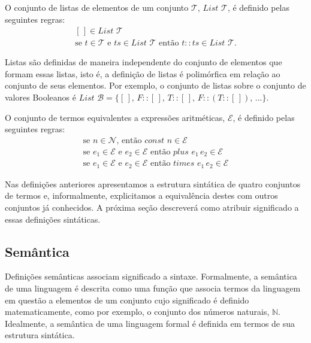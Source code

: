 \begin{Definition}
  O conjunto de listas de elementos de um conjunto $\mathcal{T}$, $\textit{List }\mathcal{T}$, \'e definido pelas seguintes regras:
  \[
  \begin{array}{l}
    [\,] \in \textit{List }\mathcal{T}\\
    \text{se }t \in \mathcal{T} \text{ e } ts \in \textit{List }\mathcal{T}\text{ ent\~ao } t :: ts \in \textit{List }\mathcal{T}.
  \end{array}
  \]
\end{Definition}
Listas s\~ao definidas de maneira independente do conjunto de elementos que formam essas listas, isto \'e, a defini\c{c}\~ao de listas
\'e polim\'orfica em rela\c{c}\~ao ao conjunto de seus elementos.
Por exemplo, o conjunto de listas sobre 
o conjunto de valores Booleanos \'e $\textit{List }\mathcal{B}=\{[\,],\,F :: [\,],\,T :: [\,],\, F :: (T :: [\,]),\, ...\}$.

\begin{Definition}\label{def:arithexp}
  O conjunto de termos equivalentes a express\~oes aritm\'eticas, $\mathcal{E}$, \'e definido pelas seguintes regras:
  \[
  \begin{array}{l}
    \text{se }n\in\mathcal{N}\text{, ent\~ao } \textit{const }n\in\mathcal{E}\\
    \text{se }e_1 \in \mathcal{E} \text{ e } e_2 \in \mathcal{E}\text{ ent\~ao }\textit{plus }e_1\,e_2\in\mathcal{E}\\
    \text{se }e_1 \in \mathcal{E} \text{ e } e_2 \in \mathcal{E}\text{ ent\~ao }\textit{times }e_1\,e_2\in\mathcal{E}
  \end{array}
  \]
\end{Definition}
Nas defini\c{c}\~oes anteriores apresentamos a estrutura sint\'atica de quatro conjuntos de termos e, informalmente, explicitamos a equival\^encia
destes com outros conjuntos j\'a conhecidos. A pr\'oxima se\c{c}\~ao descrever\'a como atribuir significado a essas defini\c{c}\~oes sint\'aticas.

\subsection{Sem\^antica}\label{cap1:sem}

Defini\c{c}\~oes sem\^anticas associam significado a sintaxe. Formalmente, a sem\^antica de uma linguagem \'e descrita como
uma fun\c{c}\~ao que associa termos da linguagem em quest\~ao a elementos de um conjunto cujo significado \'e definido
matematicamente, como por exemplo, o conjunto dos n\'umeros naturais, $\mathbb{N}$. Idealmente, a sem\^antica de uma linguagem formal
\'e definida em termos de sua estrutura sint\'atica.


